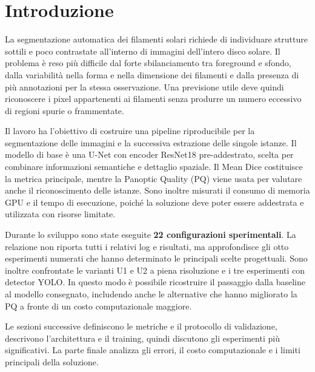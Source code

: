 \section{Introduzione}
\label{sec:intro}

La segmentazione automatica dei filamenti solari richiede di individuare strutture
sottili e poco contrastate all'interno di immagini dell'intero disco solare. Il problema
è reso più difficile dal forte sbilanciamento tra foreground e sfondo, dalla variabilità
nella forma e nella dimensione dei filamenti e dalla presenza di più annotazioni per la
stessa osservazione. Una previsione utile deve quindi riconoscere i pixel appartenenti ai
filamenti senza produrre un numero eccessivo di regioni spurie o frammentate.

Il lavoro ha l'obiettivo di costruire una pipeline riproducibile per la segmentazione
delle immagini e la successiva estrazione delle singole istanze. Il modello di base è
una U-Net con encoder ResNet18 pre-addestrato, scelta per combinare informazioni
semantiche e dettaglio spaziale. Il Mean Dice costituisce la metrica principale, mentre
la Panoptic Quality (PQ) viene usata per valutare anche il riconoscimento delle istanze.
Sono inoltre misurati il consumo di memoria GPU e il tempo di esecuzione, poiché la
soluzione deve poter essere addestrata e utilizzata con risorse limitate.

Durante lo sviluppo sono state eseguite \textbf{22 configurazioni sperimentali}. La
relazione non riporta tutti i relativi log e risultati, ma approfondisce gli otto
esperimenti numerati che hanno determinato le principali scelte progettuali. Sono inoltre
confrontate le varianti U1 e U2 a piena risoluzione e i tre esperimenti con detector
YOLO. In questo modo è possibile ricostruire il passaggio dalla baseline al modello
consegnato, includendo anche le alternative che hanno migliorato la PQ a fronte di un
costo computazionale maggiore.

Le sezioni successive definiscono le metriche e il protocollo di validazione, descrivono
l'architettura e il training, quindi discutono gli esperimenti più significativi. La
parte finale analizza gli errori, il costo computazionale e i limiti principali della
soluzione.
